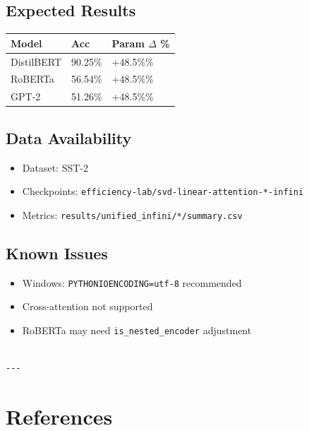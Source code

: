 \subsection{Expected Results}

\begin{table}[H]
\centering
\small
\begin{tabular}{lll}
\toprule
\textbf{Model} & \textbf{Acc} & \textbf{Param $\Delta$ \%} \\
\midrule
DistilBERT & 90.25\% & +48.5\%\% \\
RoBERTa & 56.54\% & +48.5\%\% \\
GPT-2 & 51.26\% & +48.5\%\% \\
\bottomrule
\end{tabular}
\end{table}

\subsection{Data Availability}

\begin{itemize}
\item Dataset: SST-2
\item Checkpoints: \texttt{efficiency-lab/svd-linear-attention-*-infini}
\item Metrics: \texttt{results/unified\_infini/*/summary.csv}

\end{itemize}
\subsection{Known Issues}

\begin{itemize}
\item Windows: \texttt{PYTHONIOENCODING=utf-8} recommended
\item Cross-attention not supported
\item RoBERTa may need \texttt{is\_nested\_encoder} adjustment
\end{itemize}
\begin{lstlisting}

---
\end{lstlisting}


\section{References}

